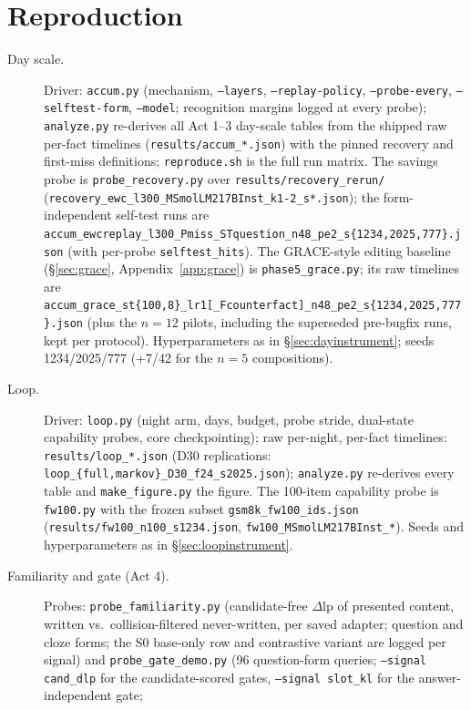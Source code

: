 \documentclass[11pt]{article}
\newcommand{\dlp}{\Delta\mathrm{lp}}
\begin{document}
\section{Reproduction}\label{app:repro}
\begingroup\small\sloppy
\begin{description}
\item[Day scale.] Driver: \texttt{accum.py} (mechanism, \texttt{--layers},
\texttt{--replay-policy}, \texttt{--probe-every}, \texttt{--selftest-form}, \texttt{--model};
recognition margins logged at every probe); \texttt{analyze.py} re-derives all Act 1--3
day-scale tables from the shipped raw per-fact timelines (\texttt{results/accum\_*.json}) with
the pinned recovery and first-miss definitions; \texttt{reproduce.sh} is the full run matrix.
The savings probe is \texttt{probe\_recovery.py} over \texttt{results/recovery\_rerun/}
(\texttt{recovery\_ewc\_l300\_MSmolLM217BInst\_k1-2\_s*.json}); the form-independent self-test
runs are \texttt{accum\_ewcreplay\_l300\_Pmiss\_STquestion\_n48\_pe2\_s\{1234,2025,777\}.json}
(with per-probe \texttt{selftest\_hits}). The GRACE-style editing baseline
(\S\ref{sec:grace}, Appendix~\ref{app:grace}) is \texttt{phase5\_grace.py}; its raw timelines
are \texttt{accum\_grace\_st\{100,8\}\_lr1[\_Fcounterfact]\_n48\_pe2\_s\{1234,2025,777\}.json}
(plus the $n{=}12$ pilots, including the superseded pre-bugfix runs, kept per protocol).
Hyperparameters as in \S\ref{sec:dayinstrument}; seeds 1234/2025/777 (+7/42 for the $n{=}5$
compositions).
\item[Loop.] Driver: \texttt{loop.py} (night arm, days, budget, probe stride, dual-state
capability probes, core checkpointing); raw per-night, per-fact timelines:
\texttt{results/loop\_*.json} (D30 replications:
\texttt{loop\_\{full,markov\}\_D30\_f24\_s2025.json}); \texttt{analyze.py} re-derives every
table and \texttt{make\_figure.py} the figure. The 100-item capability probe is
\texttt{fw100.py} with the frozen subset \texttt{gsm8k\_fw100\_ids.json}
(\texttt{results/fw100\_n100\_s1234.json}, \texttt{fw100\_MSmolLM217BInst\_*}). Seeds and
hyperparameters as in \S\ref{sec:loopinstrument}.
\item[Familiarity and gate (Act 4).] Probes: \texttt{probe\_familiarity.py} (candidate-free
$\dlp$ of presented content, written vs.\ collision-filtered never-written, per saved adapter;
question and cloze forms; the S0 base-only row and contrastive variant are logged per signal)
and \texttt{probe\_gate\_demo.py} (96 question-form queries; \texttt{--signal cand\_dlp} for the
candidate-scored gates, \texttt{--signal slot\_kl} for the answer-independent gate;

\end{description}
\end{document}
